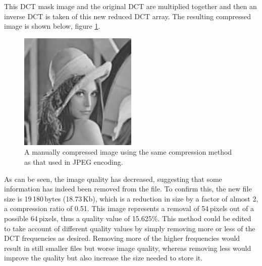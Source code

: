 This DCT mask image and the original DCT are multiplied together and then an inverse DCT is taken of this new reduced DCT array. The resulting compressed image is shown below, figure \ref{fig:mancompresslena}.
\begin{figure}[ht]
	\centering
	\includegraphics[width=0.5\textwidth]{lena_manual_compression.jpg}
	\caption{A manually compressed image using the same compression method as that used in JPEG encoding.\label{fig:mancompresslena}}
\end{figure}

As can be seen, the image quality has decreased, suggesting that some information has indeed been removed from the file. To confirm this, the new file size is 19\,180\,bytes (18.73\,Kb), which is a reduction in size by a factor of almost 2, a compression ratio of 0.51. This image represents a removal of 54\,pixels out of a possible 64\,pixels, thus a quality value of 15.625\%. This method could be edited to take account of different quality values by simply removing more or less of the DCT frequencies as desired. Removing more of the higher frequencies would result in still smaller files but worse image quality, whereas removing less would improve the quality but also increase the size needed to store it.

